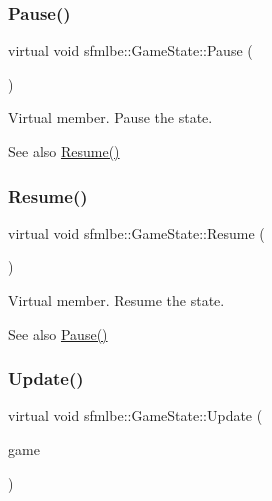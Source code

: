 \subsubsection{\texorpdfstring{Pause()}{Pause()}}
{\footnotesize\ttfamily virtual void sfmlbe\+::\+Game\+State\+::\+Pause (\begin{DoxyParamCaption}{ }\end{DoxyParamCaption})\hspace{0.3cm}{\ttfamily [pure virtual]}}



Virtual member. Pause the state. 

\begin{DoxySeeAlso}{See also}
\mbox{\hyperlink{classsfmlbe_1_1_game_state_ac45b1eba2aef82a0b15ab147da668b34}{Resume()}} 
\end{DoxySeeAlso}
\mbox{\label{classsfmlbe_1_1_game_state_ac45b1eba2aef82a0b15ab147da668b34}} 
\subsubsection{\texorpdfstring{Resume()}{Resume()}}
{\footnotesize\ttfamily virtual void sfmlbe\+::\+Game\+State\+::\+Resume (\begin{DoxyParamCaption}{ }\end{DoxyParamCaption})\hspace{0.3cm}{\ttfamily [pure virtual]}}



Virtual member. Resume the state. 

\begin{DoxySeeAlso}{See also}
\mbox{\hyperlink{classsfmlbe_1_1_game_state_a5a91935e9a6e04754373fb36d08e8358}{Pause()}} 
\end{DoxySeeAlso}
\mbox{\label{classsfmlbe_1_1_game_state_ad3a1e8eb5d0598af841e0095033fa470}} 
\subsubsection{\texorpdfstring{Update()}{Update()}}
{\footnotesize\ttfamily virtual void sfmlbe\+::\+Game\+State\+::\+Update (\begin{DoxyParamCaption}\item[{\mbox{\hyperlink{classsfmlbe_1_1_game_manager}{Game\+Manager}} $\ast$}]{game }\end{DoxyParamCaption})\hspace{0.3cm}{\ttfamily [pure virtual]}}



